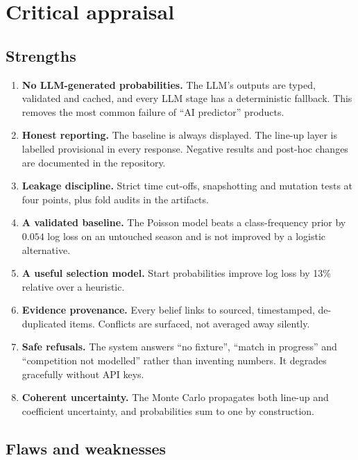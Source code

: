 \documentclass[11pt,a4paper]{article}
\begin{document}
\section{Critical appraisal}\label{sec:appraisal}

\subsection{Strengths}\label{sec:pros}
\begin{enumerate}[label=\textbf{S\arabic*.}]
  \item \textbf{No LLM-generated probabilities.} The LLM's outputs are typed,
        validated and cached, and every LLM stage has a deterministic fallback.
        This removes the most common failure of ``AI predictor'' products.
  \item \textbf{Honest reporting.} The baseline is always displayed. The
        line-up layer is labelled provisional in every response. Negative
        results and post-hoc changes are documented in the repository.
  \item \textbf{Leakage discipline.} Strict time cut-offs, snapshotting and
        mutation tests at four points, plus fold audits in the artifacts.
  \item \textbf{A validated baseline.} The Poisson model beats a
        class-frequency prior by $0.054$ log loss on an untouched season and is
        not improved by a logistic alternative.
  \item \textbf{A useful selection model.} Start probabilities improve log
        loss by 13\% relative over a heuristic.
  \item \textbf{Evidence provenance.} Every belief links to sourced,
        timestamped, de-duplicated items. Conflicts are surfaced, not averaged
        away silently.
  \item \textbf{Safe refusals.} The system answers ``no fixture'', ``match in
        progress'' and ``competition not modelled'' rather than inventing
        numbers. It degrades gracefully without API keys.
  \item \textbf{Coherent uncertainty.} The Monte Carlo propagates both line-up
        and coefficient uncertainty, and probabilities sum to one by
        construction.
\end{enumerate}

\subsection{Flaws and weaknesses}\label{sec:flaws}
\end{document}
